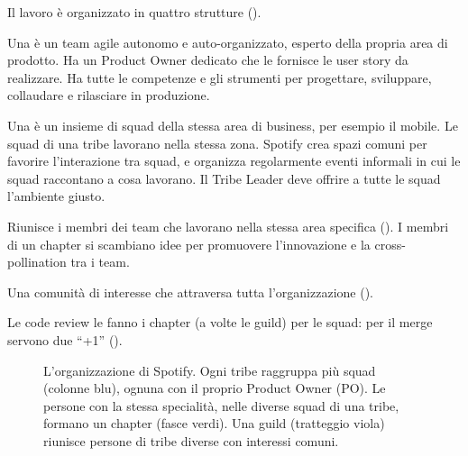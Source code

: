 Il lavoro è organizzato in quattro strutture ().
\begin{description}[leftmargin=0pt, style=unboxed]
  \item[Squad.] Una  è un team agile autonomo e auto-organizzato, esperto della propria area di prodotto.
    Ha un Product Owner dedicato che le fornisce le user story da realizzare. Ha tutte le competenze e gli strumenti per
    progettare, sviluppare, collaudare e rilasciare in produzione.
  \item[Tribe.] Una  è un insieme di squad della stessa area di business, per esempio il mobile. Le squad
    di una tribe lavorano nella stessa zona. Spotify crea spazi comuni per favorire l'interazione tra squad, e organizza
    regolarmente eventi informali in cui le squad raccontano a cosa lavorano. Il Tribe Leader deve offrire a tutte le
    squad l'ambiente giusto.
  \item[Chapter.] Riunisce i membri dei team che lavorano nella stessa area specifica (). I membri
    di un chapter si scambiano idee per promuovere l'innovazione e la cross-pollination tra i team.
  \item[Guild.] Una comunità di interesse che attraversa tutta l'organizzazione ().
\end{description}
Le code review le fanno i chapter (a volte le guild) per le squad: per il merge servono due ``+1''
().

\begin{figure}[ht]
\centering
{}
\caption{L'organizzazione di Spotify. Ogni tribe raggruppa più squad (colonne blu), ognuna con il proprio Product Owner
(PO). Le persone con la stessa specialità, nelle diverse squad di una tribe, formano un chapter (fasce verdi). Una guild
(tratteggio viola) riunisce persone di tribe diverse con interessi comuni.}
\label{fig:devops-spotify}
\end{figure}

